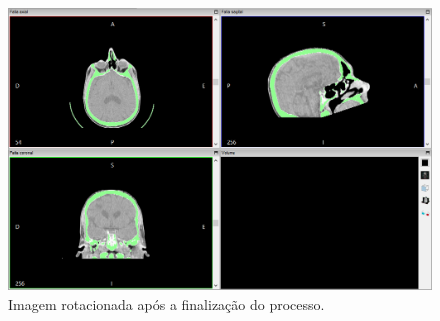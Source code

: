 \begin{figure}[!htb]
\centering
\includegraphics[scale=0.4]{../user_guide_figures/invesalius_screen/image_reorient_rotated_applied_pt.png}
\caption{Imagem rotacionada após a finalização do processo.}
\label{fig:image_reorient_rotated_applied}
\end{figure}
